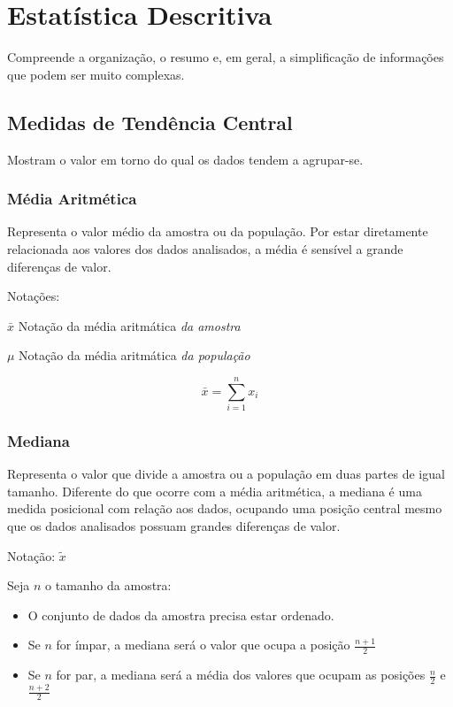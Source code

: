 \chapter{Estatística Descritiva}

Compreende a organização, o resumo e, em geral, a simplificação de informações que podem ser muito complexas.

\section{Medidas de Tendência Central}

Mostram o valor em torno do qual os dados tendem a agrupar-se.

\subsection{Média Aritmética}

Representa o valor médio da amostra ou da população. Por estar diretamente relacionada aos valores dos dados analisados, a média é sensível a grande diferenças de valor. 

Notações:

\(\bar{x}\) Notação da média aritmática \emph{da amostra}

\(\mu\) Notação da média aritmática \emph{da população}

\[\bar{x} = \sum_{i=1}^{n} x_i \] 

\subsection{Mediana}

Representa o valor que divide a amostra ou a população em duas partes de igual tamanho. Diferente do que ocorre com a média aritmética, a mediana é uma medida posicional com relação aos dados, ocupando uma posição central mesmo que os dados analisados possuam grandes diferenças de valor.

Notação: \(\tilde{x}\)

Seja \(n\) o tamanho da amostra:
\begin{itemize}
	\item O conjunto de dados da amostra precisa estar ordenado.
	\item Se \(n\) for ímpar, a mediana será o valor que ocupa a posição \(\frac{n + 1}{2}\)
	\item Se \(n\) for par, a mediana será a média dos valores que ocupam as posições \(\frac{n}{2}\) e \(\frac{n + 2}{2}\)
\end{itemize}

